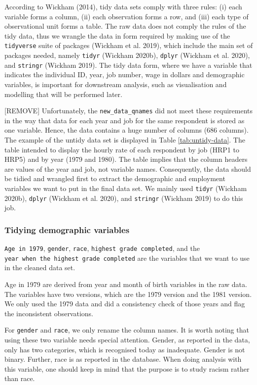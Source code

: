 \documentclass{article}
\begin{document}
According to Wickham (2014), tidy data sets comply with three rules: (i) each variable forms a column, (ii) each observation forms a row, and (iii) each type of observational unit forms a table. The raw data does not comply the rules of the tidy data, thus we wrangle the data in form required by making use of the \texttt{tidyverse} suite of packages (Wickham et al. 2019), which include the main set of packages needed, namely \texttt{tidyr} (Wickham 2020b), \texttt{dplyr} (Wickham et al. 2020), and \texttt{stringr} (Wickham 2019). The tidy data form, where we have a variable that indicates the individual ID, year, job number, wage in dollars and demographic variables, is important for downstream analysis, such as visualisation and modelling that will be performed later.

{[}REMOVE{]} Unfortunately, the \texttt{new\_data\_qnames} did not meet these requirements in the way that data for each year and job for the same respondent is stored as one variable. Hence, the data contains a huge number of columns (686 columns). The example of the untidy data set is displayed in Table \ref{tab:untidy-data}. The table intended to display the hourly rate of each respondent by job (HRP1 to HRP5) and by year (1979 and 1980). The table implies that the column headers are values of the year and job, not variable names. Consequently, the data should be tidied and wrangled first to extract the demographic and employment variables we want to put in the final data set. We mainly used \texttt{tidyr} (Wickham 2020b), \texttt{dplyr} (Wickham et al. 2020), and \texttt{stringr} (Wickham 2019) to do this job.

\hypertarget{tidydemog}{%
\subsubsection{Tidying demographic variables}\label{tidydemog}}

\texttt{Age\ in\ 1979}, \texttt{gender}, \texttt{race}, \texttt{highest\ grade\ completed}, and the \texttt{year\ when\ the\ highest\ grade\ completed} are the variables that we want to use in the cleaned data set.

Age in 1979 are derived from year and month of birth variables in the raw data. The variables have two versions, which are the 1979 version and the 1981 version. We only used the 1979 data and did a consistency check of those years and flag the inconsistent observations.

For \texttt{gender} and \texttt{race}, we only rename the column names. It is worth noting that using these two variable needs special attention. Gender, as reported in the data, only has two categories, which is recognised today as inadequate. Gender is not binary. Further, race is as reported in the database. When doing analysis with this variable, one should keep in mind that the purpose is to study racism rather than race.
\end{document}
